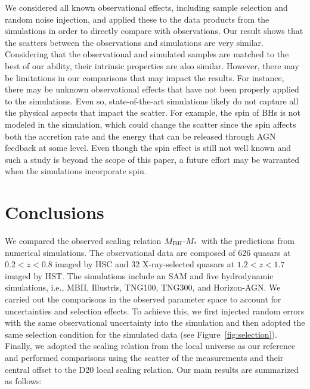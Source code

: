 \documentclass[twocolumn]{aastex631}
\def\smass{{$M_*$}}
\def\mbh{$M_{\rm BH}$}
\begin{document}
We considered all known observational effects, including sample selection and random noise injection, and applied these to the data products from the simulations in order to directly compare with observations. Our result shows that the scatters between the observations and simulations are very similar. Considering that the observational and simulated samples are matched to the best of our ability, their intrinsic properties are also similar. However, there may be limitations in our comparisons that may impact the results. For instance, there may be unknown observational effects that have not been properly applied to the simulations. Even so, state-of-the-art simulations likely do not capture all the physical aspects that impact the scatter. For example, the spin of BHs is not modeled in the simulation, which could change the scatter since the spin affects both the accretion rate and the energy that can be released through AGN feedback \citep{Dubois2014, 2019MNRAS.490.4133B, Habouzit2021} at some level. Even though the spin effect is still not well known and such a study is beyond the scope of this paper, a future effort may be warranted when the simulations incorporate spin.


\section{Conclusions} \label{sec:con}
We compared the observed scaling relation \mbh-\smass\ with the predictions from numerical simulations. The observational data are composed of 626 quasars at $0.2 < z < 0.8$ imaged by HSC and 32 X-ray-selected quasars at $1.2 < z < 1.7$ imaged by HST. The simulations include an SAM and five hydrodynamic simulations, i.e., MBII, Illustris, TNG100, TNG300, and Horizon-AGN. We carried out the comparisons in the observed parameter space to account for uncertainties and selection effects. To achieve this, we first injected random errors with the same observational uncertainty into the simulation and then adopted the same selection condition for the simulated data (see Figure~\ref{fig:selection}). Finally, we adopted the scaling relation from the local universe as our reference and performed comparisons using the scatter of the measurements and their central offset to the D20 local scaling relation. Our main results are summarized as follows:
\end{document}

